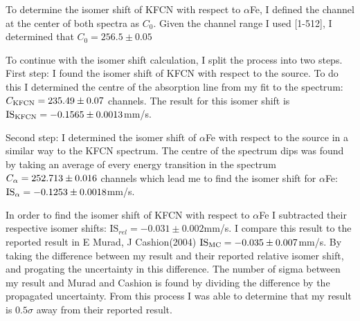 \documentclass[a4paper, twocolumn]{article}
\begin{document}
To determine the isomer shift of KFCN with respect to $\alpha$Fe, I defined the channel at the center of both spectra as $C_0$. Given the channel range I used [1-512], I determined that $C_0 = 256.5\pm0.05$

To continue with the isomer shift calculation, I split the process into two steps.
First step: I found the isomer shift of KFCN with respect to the source.
To do this I determined the centre of the absorption line from my fit to the spectrum: $C_{\rm KFCN} = 235.49\pm0.07$ channels.
The result for this isomer shift is $\textrm{IS}_{\rm KFCN} = -0.1565\pm0.0013$mm/s.

Second step: I determined the isomer shift of $\alpha$Fe with respect to the source in a similar way to the KFCN spectrum. 
The centre of the spectrum dips was found by taking an average of every energy transition in the spectrum \\$C_{\rm \alpha} = 252.713\pm0.016$ channels which lead me to find the isomer shift for $\alpha$Fe: $\textrm{IS}_{\rm \alpha} = -0.1253\pm0.0018$mm/s.




In order to find the isomer shift of KFCN with respect to $\alpha$Fe I subtracted their respective isomer shifts:
$\textrm{IS}_{rel} = -0.031\pm0.002$mm/s. I compare this result to the reported result in E Murad, J Cashion(2004) $\textrm{IS}_{\rm MC} = -0.035\pm0.007$mm/s. By taking the difference between my result and their reported relative isomer shift, and progating the uncertainty in this difference. 
The number of sigma between my result and Murad and Cashion is found by dividing the difference by the propagated uncertainty.
From this process I was able to determine that my result is $0.5\sigma$ away from their reported result.
\end{document}
